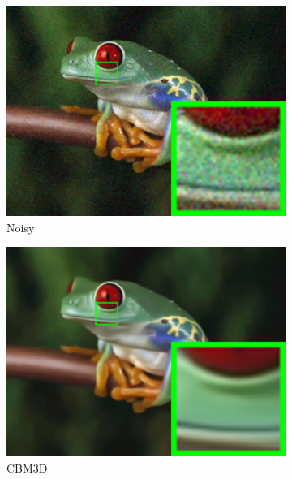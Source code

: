 \begin{figure}
    \centering
    \begin{subfigure}[t]{0.24\textwidth}
        \centering
        \includegraphics[width=1\textwidth]{images/twsc/nc/resize_br_Noisy_frog.png}
		\caption{Noisy}
    \end{subfigure}
    \hfill
    \begin{subfigure}[t]{0.24\textwidth}
        \centering
        \includegraphics[width=1\textwidth]{images/twsc/nc/resize_br_CBM3D_frog.png}
		\caption{CBM3D}
    \end{subfigure}
    \hfill
    \begin{subfigure}[t]{0.24\textwidth}
        \centering

\end{subfigure}
\end{figure}
